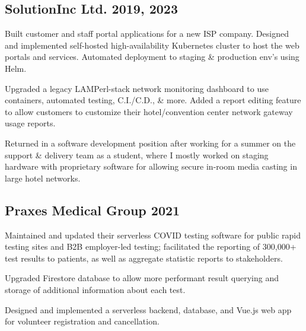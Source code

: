 \documentclass[letter,10pt]{article}
\begin{document}
\subsection{{SolutionInc Ltd. \hfill 2019, 2023}}
\begin{zitemize}
\item Built customer and staff portal applications for a new ISP company. Designed and implemented self-hosted high-availability Kubernetes cluster to host the web portals and services. Automated deployment to staging \& production env's using Helm.
\item Upgraded a legacy LAMPerl-stack network monitoring dashboard to use containers, automated testing, C.I./C.D., \& more. Added a report editing feature to allow customers to customize their hotel/convention center network gateway usage reports.
\item Returned in a software development position after working for a summer on the support \& delivery team as a student, where I mostly worked on staging hardware with proprietary software for allowing secure in-room media casting in large hotel networks.
\end{zitemize}

\subsection{{Praxes Medical Group \hfill 2021}}
\begin{zitemize}
\item Maintained and updated their serverless COVID testing software for public rapid testing sites and B2B employer-led testing; facilitated the reporting of 300,000+ test results to patients, as well as aggregate statistic reports to stakeholders.
\item Upgraded Firestore database to allow more performant result querying and storage of additional information about each test.
\item Designed and implemented a serverless backend, database, and Vue.js web app for volunteer registration and cancellation.
\end{zitemize}

\end{document}

